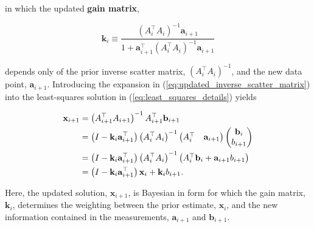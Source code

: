 \documentclass[12pt, twoside, draft]{article}
\begin{document}
in which the updated \textbf{gain matrix}, 

\begin{equation}
\mathbf{k}_i \equiv  \frac{\left( A_i^\top A_i \right)^{-1} \mathbf{a}_{i+1}}{1 + \mathbf{a}_{i+1}^\top \left( A_i^\top A_i \right)^{-1} \mathbf{a}_{i+1}}
\end{equation}

depends only of the prior inverse scatter matrix, $(A_i^\top A_i)^{-1}$, and the new data point, $\mathbf{a}_{i+1}$.  Introducing the expansion in (\ref{eq:updated_inverse_scatter_matrix}) into the least-squares solution in (\ref{eq:least_squares_details}) yields

\begin{align}
\mathbf{x}_{i+1} &= \left( A_{i+1}^\top A_{i+1} \right)^{-1} A_{i+1}^\top \mathbf{b}_{i+1} \notag \\
&=  \left( I - \mathbf{k}_i \mathbf{a}_{i+1}^\top \right) \left( A_i^\top A_i \right)^{-1} \begin{pmatrix} A_i^\top & \mathbf{a}_{i+1} \end{pmatrix}
\begin{pmatrix} \mathbf{b}_i \\ b_{i+1} \end{pmatrix} \notag \\
&=  \left( I - \mathbf{k}_i \mathbf{a}_{i+1}^\top \right) \left( A_i^\top A_i \right)^{-1} \begin{pmatrix} A_i^\top \mathbf{b}_i + \mathbf{a}_{i+1} b_{i+1} \end{pmatrix} \notag \\
&= \left(I - \mathbf{k}_i \mathbf{a}_{i+1}^\top \right) \mathbf{x}_i + \mathbf{k}_i b_{i+1}.
\end{align}

Here, the updated solution, $\mathbf{x}_{i+1}$, is Bayesian in form for which the gain matrix, $\mathbf{k}_i$, determines the weighting between the prior estimate, $\mathbf{x}_i$, and the new information contained in the measurements, $\mathbf{a}_{i+1}$ and $\mathbf{b}_{i+1}$.
\end{document}

